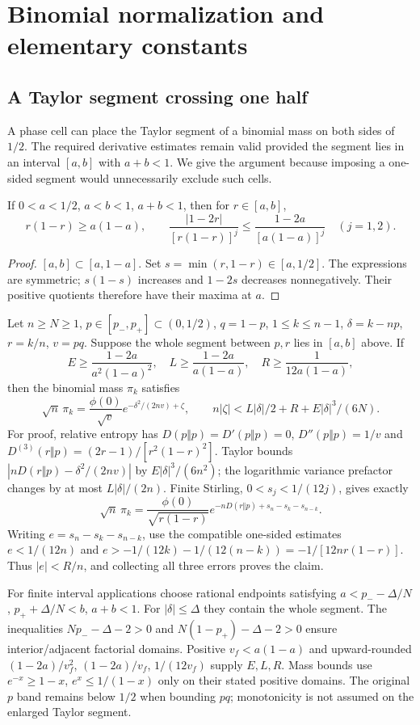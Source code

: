 \section{Binomial normalization and elementary constants}\label{ms:normalization}
\subsection{A Taylor segment crossing one half}
A phase cell can place the Taylor segment of a binomial mass on both sides of $1/2$. The required derivative estimates remain valid provided the segment lies in an interval $[a,b]$ with $a+b<1$. We give the argument because imposing a one-sided segment would unnecessarily exclude such cells.

\begin{lemma}
If $0<a<1/2$, $a<b<1$, $a+b<1$, then for $r\in[a,b]$,
\[
 r(1-r)\ge a(1-a),\qquad
 \frac{|1-2r|}{[r(1-r)]^j}\le\frac{1-2a}{[a(1-a)]^j}\quad(j=1,2).
\]
\end{lemma}
\begin{proof}
$[a,b]\subset[a,1-a]$. Set $s=\min(r,1-r)\in[a,1/2]$. The expressions
are symmetric; $s(1-s)$ increases and $1-2s$ decreases nonnegatively.
Their positive quotients therefore have their maxima at $a$.
\end{proof}
Let $n\ge N\ge1$, $p\in[p_-,p_+]\subset(0,1/2)$, $q=1-p$,
$1\le k\le n-1$, $\delta=k-np$, $r=k/n$, $v=pq$. Suppose the whole
segment between $p,r$ lies in $[a,b]$ above. If
\[
 E\ge\frac{1-2a}{a^2(1-a)^2},\quad L\ge\frac{1-2a}{a(1-a)},
 \quad R\ge\frac1{12a(1-a)},
\]
then the binomial mass $\pi_k$ satisfies
\[
 \sqrt n\,\pi_k=\frac{\phi(0)}{\sqrt v}
 e^{-\delta^2/(2nv)+\zeta},\qquad
 n|\zeta|<L|\delta|/2+R+E|\delta|^3/(6N).
\]
For proof, relative entropy has $D(p\Vert p)=D'(p\Vert p)=0$,
$D''(p\Vert p)=1/v$ and
$D^{(3)}(r\Vert p)=(2r-1)/[r^2(1-r)^2]$.
Taylor bounds $|nD(r\Vert p)-\delta^2/(2nv)|$ by
$E|\delta|^3/(6n^2)$; the logarithmic variance prefactor changes by at
most $L|\delta|/(2n)$. Finite Stirling, $0<s_j<1/(12j)$, gives exactly
\[
 \sqrt n\,\pi_k=\frac{\phi(0)}{\sqrt{r(1-r)}}
 e^{-nD(r\Vert p)+s_n-s_k-s_{n-k}}.
\]
Writing $e=s_n-s_k-s_{n-k}$, use the compatible one-sided estimates
$e<1/(12n)$ and
$e>-1/(12k)-1/(12(n-k))=-1/[12nr(1-r)]$.
Thus $|e|<R/n$, and collecting all three errors proves the claim.

For finite interval applications choose rational endpoints satisfying
$a<p_- -\Delta/N$, $p_++\Delta/N<b$, $a+b<1$.
For $|\delta|\le\Delta$ they contain the whole segment. The inequalities
$Np_- -\Delta-2>0$ and $N(1-p_+)-\Delta-2>0$ ensure interior/adjacent
factorial domains. Positive $v_f<a(1-a)$ and upward-rounded
$(1-2a)/v_f^2$, $(1-2a)/v_f$, $1/(12v_f)$ supply $E,L,R$.
Mass bounds use $e^{-x}\ge1-x$, $e^x\le1/(1-x)$ only on their stated
positive domains. The original $p$ band remains below $1/2$ when bounding
$pq$; monotonicity is not assumed on the enlarged Taylor segment.

